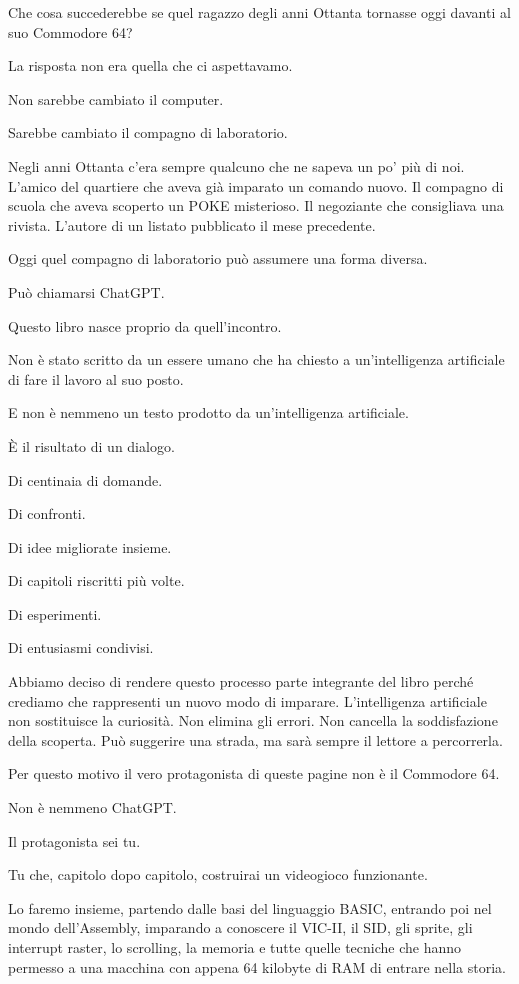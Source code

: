 \documentclass{article}
\begin{document}
Che cosa succederebbe se quel ragazzo degli anni Ottanta tornasse oggi davanti al suo Commodore 64?

La risposta non era quella che ci aspettavamo.

Non sarebbe cambiato il computer.

Sarebbe cambiato il compagno di laboratorio.

Negli anni Ottanta c'era sempre qualcuno che ne sapeva un po' più di noi. L'amico del quartiere che aveva già imparato
un comando nuovo. Il compagno di scuola che aveva scoperto un POKE misterioso. Il negoziante che consigliava una
rivista. L'autore di un listato pubblicato il mese precedente.

Oggi quel compagno di laboratorio può assumere una forma diversa.

Può chiamarsi ChatGPT.

Questo libro nasce proprio da quell'incontro.

Non è stato scritto da un essere umano che ha chiesto a un'intelligenza artificiale di fare il lavoro al suo posto.

E non è nemmeno un testo prodotto da un'intelligenza artificiale.

È il risultato di un dialogo.

Di centinaia di domande.

Di confronti.

Di idee migliorate insieme.

Di capitoli riscritti più volte.

Di esperimenti.

Di entusiasmi condivisi.

Abbiamo deciso di rendere questo processo parte integrante del libro perché crediamo che rappresenti un nuovo modo di
imparare. L'intelligenza artificiale non sostituisce la curiosità. Non elimina gli errori. Non cancella la
soddisfazione della scoperta. Può suggerire una strada, ma sarà sempre il lettore a percorrerla.

Per questo motivo il vero protagonista di queste pagine non è il Commodore 64.

Non è nemmeno ChatGPT.

Il protagonista sei tu.

Tu che, capitolo dopo capitolo, costruirai un videogioco funzionante.

Lo faremo insieme, partendo dalle basi del linguaggio BASIC, entrando poi nel mondo dell'Assembly, imparando a conoscere
il VIC-II, il SID, gli sprite, gli interrupt raster, lo scrolling, la memoria e tutte quelle tecniche che hanno
permesso a una macchina con appena 64 kilobyte di RAM di entrare nella storia.
\end{document}
